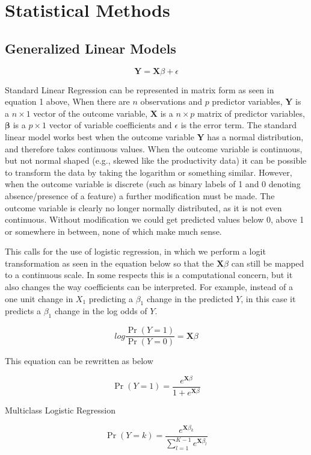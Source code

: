 \documentclass{article}
\newcommand{\bX}{\mathbf{X}}
\newcommand{\bY}{\mathbf{Y}}
\newcommand{\bbeta}{\mathbf{\beta}}
\begin{document}
\section{Statistical Methods} \label{stat_methods}

\subsection{Generalized Linear Models}

\[\bY = \bX\beta + \epsilon \tag{1}\]

Standard Linear Regression can be represented in matrix form as seen in equation 1 above, When there are $n$ observations and $p$ predictor variables,  $\bY$ is a $n \times 1$ vector of the outcome variable, $\bX$ is a $n \times p$ matrix of predictor variables, $\bbeta$ is a $p \times 1$ vector of variable coefficients and $\epsilon$ is the error 
term. The standard linear model works best when the outcome variable $\bY$ has a normal distribution, and therefore takes 
continuous values. When the outcome variable is continuous, but not normal shaped (e.g., skewed like the productivity 
data) it can be possible to transform the data by taking the logarithm or something similar. However, when the outcome 
variable is discrete (such as binary labels of 1 and 0 denoting absence/presence of a feature) a further modification must be made. The outcome variable is clearly no longer normally distributed, as it is not even continuous. Without modification we could get predicted values below 0, above 1 or somewhere in between, none of which make much sense.

This calls for the use of logistic regression, in which we perform a logit transformation as seen in the equation below so that the 
$\bX\beta$ can still be mapped to a continuous scale. In some respects this is a computational concern, but it also changes the 
way coefficients can be interpreted. For example, instead of a one unit change in $X_1$ predicting a $\beta_1$ change in the predicted $Y$, 
in this case it predicts a $\beta_1$ change in the log odds of $Y$.

\[log \frac{\Pr(Y = 1)}{\Pr(Y = 0)} = \bX\beta \]

This equation can be rewritten as below

\[ \Pr(Y = 1) = \frac{e^{\bX\beta}}{1 + e^{\bX\beta}} \]

Multiclass Logistic Regression

\[ \Pr(Y = k) = \frac{e^{\bX\beta_k}}{\sum_{l=1}^{K-1} e^{\bX\beta_l}} \]
\end{document}
